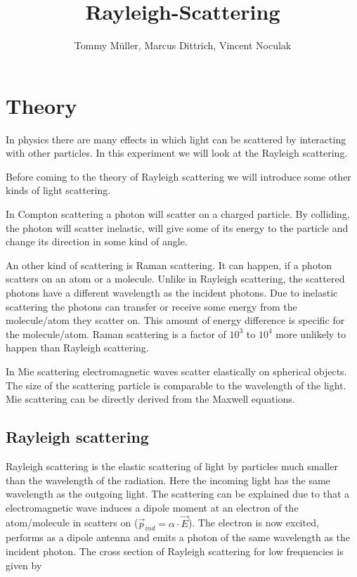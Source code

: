 \documentclass[10pt,a4paper]{article}
\author{Tommy Müller, Marcus Dittrich, Vincent Noculak}
\title{Rayleigh-Scattering}
\begin{document}
\maketitle
\newpage
\newpage

\section{Theory}

In physics there are many effects in which light can be scattered by interacting with other particles. In this experiment we will look at the Rayleigh scattering.

Before coming to the theory of Rayleigh scattering we will introduce some other kinds of light scattering.

In Compton scattering a photon will scatter on a charged particle. By colliding, the photon will scatter inelastic, will give some of its energy to the particle and change its direction in some kind of angle.

An other kind of scattering is Raman scattering. It can happen, if a photon scatters on an atom or a molecule. Unlike in Rayleigh scattering, the scattered photons have a different wavelength as the incident photons. Due to inelastic scattering the photons can transfer or receive some energy from the molecule/atom they scatter on. This amount of energy difference is specific for the molecule/atom. Raman scattering is a factor of $10^3$ to $10^4$ more unlikely to happen than Rayleigh scattering.

In Mie scattering electromagnetic waves scatter elastically on spherical objects. The size of the scattering particle is comparable to the wavelength of the light. Mie scattering can be directly derived from the Maxwell equations.

\subsection{Rayleigh scattering}

Rayleigh scattering is the elastic scattering of light by particles much smaller than the wavelength of the radiation. Here the incoming light has the same wavelength as the outgoing light.
The scattering can be explained due to that a electromagnetic wave induces a dipole moment at an electron of the atom/molecule in scatters on ($\vec{p}_{ind} = \alpha \cdot \vec{E}$). The electron is now excited, performs as a dipole antenna and emits a photon of the same wavelength as the incident photon.
The cross section of Rayleigh scattering for low frequencies is given by
\end{document}

